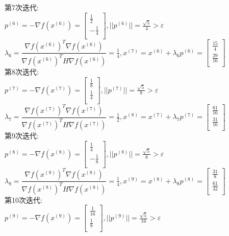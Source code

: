 \begin{solution}
    第7次迭代:\\
    $p^{(6)}=-\nabla f(x^{(6)})=\begin{bmatrix} \frac{1}{2}\\-\frac{1}{4}\\\end{bmatrix},||p^{(6)}||=\frac{\sqrt{5}}{4}>\varepsilon$\\
    $\lambda_6=\dfrac{\nabla f(x^{(6)})^T\nabla f(x^{(6)})}{\nabla f(x^{(6)})^TH\nabla f(x^{(6)})}=\frac{1}{4},x^{(7)}=x^{(6)}+\lambda_6p^{(6)}=\begin{bmatrix} \frac{15}{4}\\\frac{29}{16}\\\end{bmatrix}$\\
    第8次迭代:\\
    $p^{(7)}=-\nabla f(x^{(7)})=\begin{bmatrix} \frac{1}{8}\\\frac{1}{4}\\\end{bmatrix},||p^{(7)}||=\frac{\sqrt{5}}{8}>\varepsilon$\\
    $\lambda_7=\dfrac{\nabla f(x^{(7)})^T\nabla f(x^{(7)})}{\nabla f(x^{(7)})^TH\nabla f(x^{(7)})}=\frac{1}{2},x^{(8)}=x^{(7)}+\lambda_7p^{(7)}=\begin{bmatrix} \frac{61}{16}\\\frac{31}{16}\\\end{bmatrix}$\\
    第9次迭代:\\
    $p^{(8)}=-\nabla f(x^{(8)})=\begin{bmatrix} \frac{1}{4}\\-\frac{1}{8}\\\end{bmatrix},||p^{(8)}||=\frac{\sqrt{5}}{8}>\varepsilon$\\
    $\lambda_8=\dfrac{\nabla f(x^{(8)})^T\nabla f(x^{(8)})}{\nabla f(x^{(8)})^TH\nabla f(x^{(8)})}=\frac{1}{4},x^{(9)}=x^{(8)}+\lambda_8p^{(8)}=\begin{bmatrix} \frac{31}{8}\\\frac{61}{32}\\\end{bmatrix}$\\
    第10次迭代:\\
    $p^{(9)}=-\nabla f(x^{(9)})=\begin{bmatrix} \frac{1}{16}\\\frac{1}{8}\\\end{bmatrix},||p^{(9)}||=\frac{\sqrt{5}}{16}>\varepsilon$\\

\end{solution}
